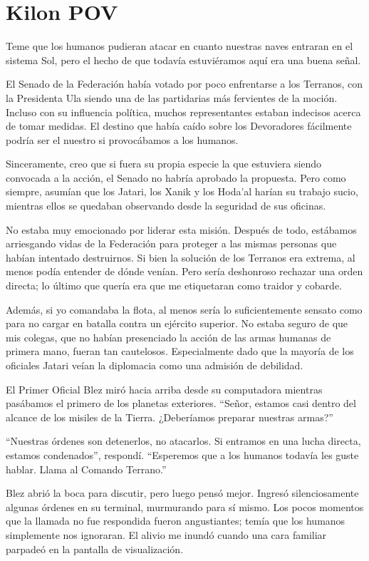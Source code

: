 \documentclass[spanish,12pt,a4paper,oneside,titlepage]{book}
\begin{document}
    \chapter{Kilon POV}

    Teme que los humanos pudieran atacar en cuanto nuestras naves entraran en el sistema Sol, pero el hecho de que todavía estuviéramos aquí era una buena señal.

    El Senado de la Federación había votado por poco enfrentarse a los Terranos, con la Presidenta Ula siendo una de las partidarias más fervientes de la moción. Incluso con su influencia política, muchos representantes estaban indecisos acerca de tomar medidas. El destino que había caído sobre los Devoradores fácilmente podría ser el nuestro si provocábamos a los humanos.

    Sinceramente, creo que si fuera su propia especie la que estuviera siendo convocada a la acción, el Senado no habría aprobado la propuesta. Pero como siempre, asumían que los Jatari, los Xanik y los Hoda’al harían su trabajo sucio, mientras ellos se quedaban observando desde la seguridad de sus oficinas.

    No estaba muy emocionado por liderar esta misión. Después de todo, estábamos arriesgando vidas de la Federación para proteger a las mismas personas que habían intentado destruirnos. Si bien la solución de los Terranos era extrema, al menos podía entender de dónde venían. Pero sería deshonroso rechazar una orden directa; lo último que quería era que me etiquetaran como traidor y cobarde.

    Además, si yo comandaba la flota, al menos sería lo suficientemente sensato como para no cargar en batalla contra un ejército superior. No estaba seguro de que mis colegas, que no habían presenciado la acción de las armas humanas de primera mano, fueran tan cautelosos. Especialmente dado que la mayoría de los oficiales Jatari veían la diplomacia como una admisión de debilidad.

    El Primer Oficial Blez miró hacia arriba desde su computadora mientras pasábamos el primero de los planetas exteriores. “Señor, estamos casi dentro del alcance de los misiles de la Tierra. ¿Deberíamos preparar nuestras armas?”

    “Nuestras órdenes son detenerlos, no atacarlos. Si entramos en una lucha directa, estamos condenados”, respondí. “Esperemos que a los humanos todavía les guste hablar. Llama al Comando Terrano.”

    Blez abrió la boca para discutir, pero luego pensó mejor. Ingresó silenciosamente algunas órdenes en su terminal, murmurando para sí mismo. Los pocos momentos que la llamada no fue respondida fueron angustiantes; temía que los humanos simplemente nos ignoraran. El alivio me inundó cuando una cara familiar parpadeó en la pantalla de visualización.
\end{document}
